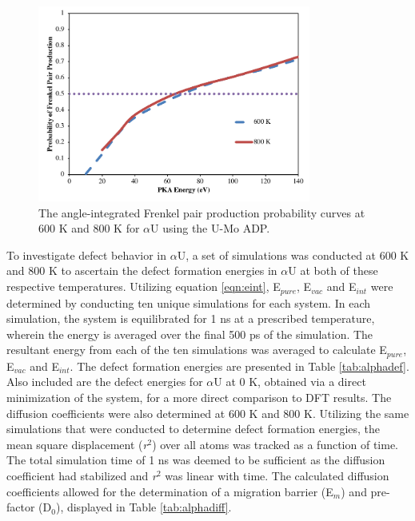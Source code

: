 \documentclass[review]{elsarticle}
\providecommand{\DIFaddbeginFL}{} %
\providecommand{\DIFaddendFL}{} %
\providecommand{\DIFdelbeginFL}{} %
\providecommand{\DIFdelendFL}{} %
\newcommand{\DIFscaledelfig}{0.5}
\newlength{\DIFdelgraphicswidth} %
\newlength{\DIFdelgraphicsheight} %
\newcommand{\DIFaddincludegraphics}[2][]{{\color{blue}\fbox{\DIFOincludegraphics[#1]{#2}}}} %
\newcommand{\DIFdelincludegraphics}[2][]{%
\sbox{\DIFdelgraphicsbox}{\DIFOincludegraphics[#1]{#2}}%
\settoboxwidth{\DIFdelgraphicswidth}{\DIFdelgraphicsbox} %
\settoboxtotalheight{\DIFdelgraphicsheight}{\DIFdelgraphicsbox} %
\scalebox{\DIFscaledelfig}{%
\parbox[b]{\DIFdelgraphicswidth}{\usebox{\DIFdelgraphicsbox}\\[-\baselineskip] \rule{\DIFdelgraphicswidth}{0em}}\llap{\resizebox{\DIFdelgraphicswidth}{\DIFdelgraphicsheight}{%
\setlength{\unitlength}{\DIFdelgraphicswidth}%
\begin{picture}(1,1)%
\thicklines\linethickness{2pt} %
{\color[rgb]{1,0,0}\put(0,0){\framebox(1,1){}}}%
{\color[rgb]{1,0,0}\put(0,0){\line( 1,1){1}}}%
{\color[rgb]{1,0,0}\put(0,1){\line(1,-1){1}}}%
\end{picture}%
}\hspace*{3pt}}} %
} %
\DeclareRobustCommand{\DIFaddbeginFL}{\DIFOaddbeginFL \let\includegraphics\DIFaddincludegraphics} %
\DeclareRobustCommand{\DIFaddendFL}{\DIFOaddendFL \let\includegraphics\DIFOincludegraphics} %
\DeclareRobustCommand{\DIFdelbeginFL}{\DIFOdelbeginFL \let\includegraphics\DIFdelincludegraphics} %
\DeclareRobustCommand{\DIFdelendFL}{\DIFOaddendFL \let\includegraphics\DIFOincludegraphics} %
\begin{document}
\begin{figure}[h]
 \centering
 \DIFdelbeginFL %
\DIFdelendFL \DIFaddbeginFL \includegraphics[width=0.8\textwidth]{alphaA.png} 	
 \DIFaddendFL \caption{The angle-integrated Frenkel pair production probability curves at 600 K and 800 K for $\alpha$U using the U-Mo ADP.}
 \label{fig:alpha}
\end{figure}

\FloatBarrier

To investigate defect behavior in $\alpha$U, a set of simulations was conducted at 600 K and 800 K to ascertain the defect formation energies in $\alpha$U at both of these respective temperatures. Utilizing equation \ref{eqn:eint}, E$_{pure}$, E$_{vac}$ and E$_{int}$ were determined by conducting ten unique simulations for each system. In each simulation, the system is equilibrated for 1 ns at a prescribed temperature, wherein the energy is averaged over the final 500 ps of the simulation. The resultant energy from each of the ten simulations was averaged to calculate E$_{pure}$, E$_{vac}$ and E$_{int}$. The defect formation energies are presented in Table \ref{tab:alphadef}. Also included are the defect energies for $\alpha$U at 0 K, obtained via a direct minimization of the system, for a more direct comparison to DFT results. The diffusion coefficients were also determined at 600 K and 800 K. Utilizing the same simulations that were conducted to determine defect formation energies, the mean square displacement (\textit{r}$^{2}$) over all atoms was tracked as a function of time. The total simulation time of 1 ns was deemed to be sufficient as the diffusion coefficient had stabilized and \textit{r}$^{2}$ was linear with time. The calculated diffusion coefficients allowed for the determination of a migration barrier (E$_{m}$) and pre-factor (D$_{0}$), displayed in Table \ref{tab:alphadiff}.
\end{document}
